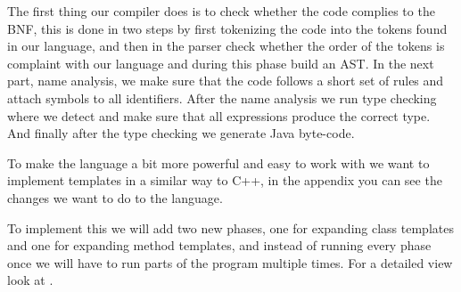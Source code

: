 \iffalse
We want to implement templates in a similar way to C++, in the appendix you can
see the changes we want to do to the language.

To implement this we will add a new phase between the name analysis and type
checking to expand the templates with the needed types. If we for example
define a method \textbf{max\tmpl{T}(a:T,b:T):T} and call it with a pair of Ints
and a pair of Strings we need to expand the code into one method for ints and
one for strings, for example \textbf{max\$Int(a:Int,b:Int):Int}.

This in addition to adding a new Type or Symbol for templates is all the
changes we think are necessary for implementing templates. In particular, the
type checking and code generation phases should not need to be modified since
we will require explicit type arguments in references to template types and
methods. Automatic inference of type parameters where possible is proposed as a
further extension if we get the time.

In the name analysis phase we simply add a template symbol to all references to
templates, and in the phase before type checking we expand the template by adding
any needed classes and methods to the AST. The template symbol contains a list of
either methodSymbols or classSymbols for all the versions that has been created.
\fi

\iftrue
The first thing our compiler does is to check whether the code complies to
the BNF, this is done in two steps by first tokenizing the code into the
tokens found in our language, and then in the parser check whether the order
of the tokens is complaint with our language and during this phase build an AST.
In the next part, name analysis, we make sure that the code follows a short set
of rules and attach symbols to all identifiers. After the name analysis we run type
checking where we detect and make sure that all expressions produce the correct
type. And finally after the type checking we generate Java byte-code.

To make the language a bit more powerful and easy to work with we want to
implement templates in a similar way to C++, in the appendix you can
see the changes we want to do to the language.

To implement this we will add two new phases, one for expanding class templates
and one for expanding method templates, and instead of running every phase once
we will have to run parts of the program multiple times. For a detailed view
look at .

\fi
